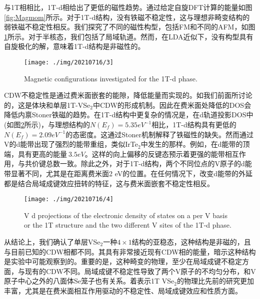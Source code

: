 \documentclass[reprint, aps, prb, showkeys]{revtex4-2}
\begin{document}
与1T相相比，1T-d相给出了更低的磁性趋势。通过给定自旋DFT计算的能量如图\ref{fig:Magmom}所示。对于1T-d结构，没有铁磁不稳定性，这与理想非畸变结构的弱铁磁不稳定性相反。我们探究了不同的磁性构型，包括FM和不同的AFM，如图\ref{fig:MagStructure}所示。对于半核态，我们包括了局域轨道。然而，在LDA近似下，没有构型具有自旋极化的解，意味着1T-d结构是非磁性的。

\begin{figure}[t]
    \texttt{[image: ./img/20210716/3]}
    \caption{\label{fig:MagStructure} 
    Magnetic configurations investigated for the 1T-d phase.
    }
\end{figure}

CDW不稳定性是通过费米面嵌套的能隙，降低能量而实现的。如我们前面所讨论的，这是体块和单层1T-VSe$_2$中CDW的形成机制。因此在费米面处降低的DOS会降低内禀Stoner铁磁的趋势。在1T-d结构中更复杂的情况是，在d轨道投影DOS中(如图\ref{fig:DOS}所示)，与理想结构的$N(E_f) = 5.35 eV^{-1}$相比，1T-d结构具有更低的$N(E_f) = 2.09 eV^{-1}$的态密度。这通过Stoner机制解释了铁磁性的缺失。然而通过V的d能带出现了强烈的能带重组，类似IrTe$_2$中发生的那样。例如，在d能带的顶端，具有更高的能量$~ 3.5 eV$。这样的向上偏移的反键态预示着更强的能带相互作用，与共价键总数一致。除此之外，对于1T-d结构，两个不同位点的V原子的d能带显著不同，尤其是在距离费米面2 eV的位置。在任何情况下，改变d能带的外延都是结合局域成键效应扭转的特征，这与费米面嵌套不稳定性相反。

\begin{figure}[t]
    \texttt{[image: ./img/20210716/4]}
    \caption{\label{fig:DOS} 
    V d projections of the electronic density of states on a per V basis or the 1T structure and the two different V sites of the 1T-d phase.
    }
\end{figure}

从结论上，我们确认了单层VSe$_2$一种$4 \times 1$结构的亚稳态，这种结构是非磁的，且与目前已知的CDW相都不同。其具有非常接近现有CDW相的能量，暗示这种结构是实验中可能观察到的。重要的是，这种畸变的物理，至少在局域成键不稳定方面，与现有的CDW不同。局域成键不稳定性导致了两个V原子的不均匀分布，和V原子中心之外的八面体Se笼子也有关系。着表示1T VSe$_2$的物理比先前的研究更加丰富，尤其是在费米面相互作用驱动的不稳定性、局域成键效应和性质方面。
\end{document}

